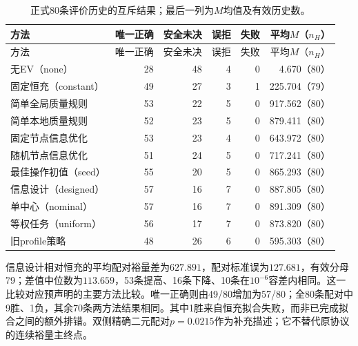 {\small
\begin{longtable}{L{.31\textwidth}rrrrr}
\caption{正式80条评价历史的互斥结果；最后一列为$M$均值及有效历史数。}\label{tab:information-outcomes-v3}\\
\toprule
方法 & 唯一正确 & 安全未决 & 误拒 & 失败 & 平均$M$（$n_H$）\\
\midrule\endfirsthead
\toprule
方法 & 唯一正确 & 安全未决 & 误拒 & 失败 & 平均$M$（$n_H$）\\
\midrule\endhead
无EV（none） &28&48&4&0&4.670（80）\\
固定恒充（constant） &49&27&3&1&225.704（79）\\
简单全局质量规则 &53&22&5&0&917.562（80）\\
简单本地质量规则 &52&23&5&0&879.411（80）\\
固定节点信息优化 &53&23&4&0&643.972（80）\\
随机节点信息优化 &51&24&5&0&717.241（80）\\
最佳操作初值（seed） &55&20&5&0&865.293（80）\\
信息设计（designed） &57&16&7&0&887.805（80）\\
单中心（nominal） &57&16&7&0&891.309（80）\\
等权任务（uniform） &56&17&7&0&873.820（80）\\
旧profile策略 &48&26&6&0&595.303（80）\\
\bottomrule
\end{longtable}}

信息设计相对恒充的平均配对裕量差为$627.891$，配对标准误为$127.681$，有效分母79；差值中位数为$113.659$，53条提高、16条下降、10条在$10^{-6}$容差内相同。这一比较对应预声明的主要方法比较。唯一正确则由49/80增加为57/80；全80条配对中9胜、1负，其余70条两方法结果相同。其中1胜来自恒充拟合失败，而非已完成拟合之间的额外排错。双侧精确二元配对$p=0.0215$作为补充描述；它不替代原协议的连续裕量主终点。


